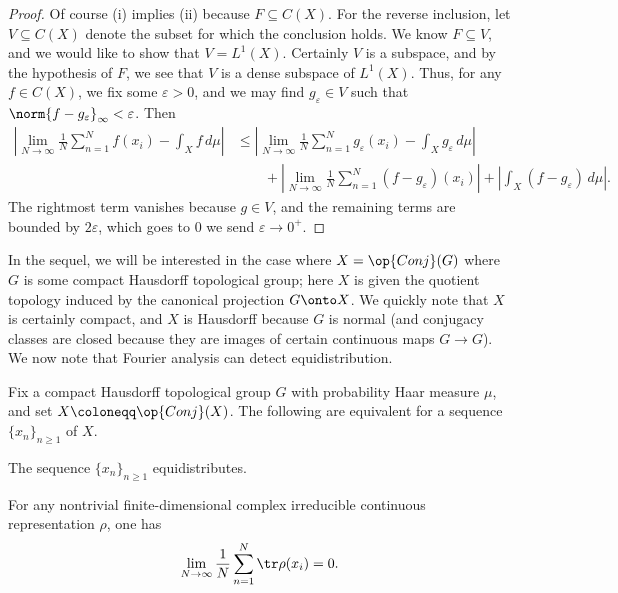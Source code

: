 \documentclass[../thesis.tex]{subfiles}
\begin{document}
\begin{proof}
	Of course (i) implies (ii) because $F\subseteq C(X)$. For the reverse inclusion, let $V\subseteq C(X)$ denote the subset for which the conclusion holds. We know $F\subseteq V$, and we would like to show that $V=L^1(X)$. Certainly $V$ is a subspace, and by the hypothesis of $F$, we see that $V$ is a dense subspace of $L^1(X)$. Thus, for any $f\in C(X)$, we fix some $\varepsilon>0$, and we may find $g_\varepsilon\in V$ such that $\norm{f-g_\varepsilon}_\infty<\varepsilon$. Then
	\begin{align*}
		\left|\lim_{N\to\infty}\frac1N\sum_{n=1}^Nf(x_i)-\int_Xf\,d\mu\right| &\le \left|\lim_{N\to\infty}\frac1N\sum_{n=1}^Ng_\varepsilon(x_i)-\int_Xg_\varepsilon\,d\mu\right| \\
		&\qquad+\left|\lim_{N\to\infty}\frac1N\sum_{n=1}^N(f-g_\varepsilon)(x_i)\right|+\left|\int_X(f-g_\varepsilon)\,d\mu\right|.
	\end{align*}
	The rightmost term vanishes because $g\in V$, and the remaining terms are bounded by $2\varepsilon$, which goes to $0$ we send $\varepsilon\to0^+$.
\end{proof}
In the sequel, we will be interested in the case where $X=\op{Conj}(G)$ where $G$ is some compact Hausdorff topological group; here $X$ is given the quotient topology induced by the canonical projection $G\onto X$. We quickly note that $X$ is certainly compact, and $X$ is Hausdorff because $G$ is normal (and conjugacy classes are closed because they are images of certain continuous maps $G\to G$). We now note that Fourier analysis can detect equidistribution.
\begin{lemma} \label{lem:equi-by-chars}
	Fix a compact Hausdorff topological group $G$ with probability Haar measure $\mu$, and set $X\coloneqq\op{Conj}(X)$. The following are equivalent for a sequence $\{x_n\}_{n\ge1}$ of $X$.
	\begin{listroman}
		\item The sequence $\{x_n\}_{n\ge1}$ equidistributes.
		\item For any nontrivial finite-dimensional complex irreducible continuous representation $\rho$, one has
		\[\lim_{N\to\infty}\frac1N\sum_{n=1}^N\tr\rho(x_i)=0.\]
	\end{listroman}
\end{lemma}
\end{document}
